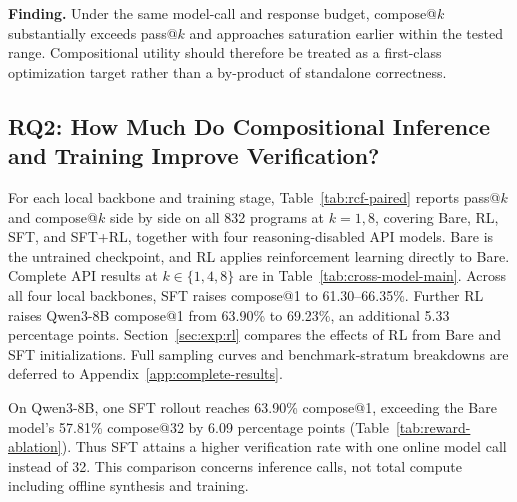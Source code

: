 \begin{insightbox}
\textbf{Finding.}
Under the same model-call and response budget, compose@\(k\) substantially
exceeds pass@\(k\) and approaches saturation earlier within the tested range.
Compositional utility should
therefore be treated as a first-class optimization target rather than a
by-product of standalone correctness.
\end{insightbox}

\subsection{RQ2: How Much Do Compositional Inference and Training Improve Verification?}
\label{sec:exp:main}

For each local backbone and training stage, Table~\ref{tab:rcf-paired}
reports pass@\(k\) and compose@\(k\) side by side on all 832 programs at
\(k{=}1,8\), covering Bare, RL, SFT, and SFT+RL, together with four
reasoning-disabled API models.  Bare is the untrained checkpoint, and RL
applies reinforcement learning directly to Bare.  Complete API results at
\(k\in\{1,4,8\}\) are in Table~\ref{tab:cross-model-main}.
Across all four local backbones, SFT
raises compose@1 to 61.30--66.35\%.  Further RL raises Qwen3-8B compose@1
from 63.90\% to 69.23\%, an additional 5.33 percentage points.
Section~\ref{sec:exp:rl} compares the effects of RL from
Bare and SFT initializations.  Full
sampling curves and benchmark-stratum breakdowns are deferred to
Appendix~\ref{app:complete-results}.

On Qwen3-8B, one SFT rollout reaches 63.90\% compose@1, exceeding
the Bare model's 57.81\% compose@32 by 6.09 percentage points
(Table~\ref{tab:reward-ablation}).  Thus SFT attains a higher verification
rate with one online model call instead of 32.  This comparison concerns
inference calls, not total compute including offline synthesis and training.

